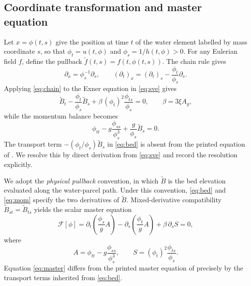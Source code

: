 \documentclass[12pt,a4paper]{article}
\begin{document}
\subsection*{Coordinate transformation and master equation}
Let $x=\phi(t,s)$ give the position at time $t$ of the water element labelled by mass coordinate $s$, so that $\phi_t=u(t,\phi)$ and $\phi_s=1/h(t,\phi)>0$. For any Eulerian field $f$, define the pullback $\tilde f(t,s)=f(t,\phi(t,s))$. The chain rule gives
\begin{equation}
\partial_x=\phi_s^{-1}\partial_s,\qquad
(\partial_t)_x=(\partial_t)_s-\frac{\phi_t}{\phi_s}\partial_s.
\label{eq:chain}
\end{equation}
Applying \eqref{eq:chain} to the Exner equation in \eqref{eq:sve} gives
\begin{equation}
\tilde B_t-\frac{\phi_t}{\phi_s}\tilde B_s+\beta\,(\phi_t)^{2}\frac{\phi_{ts}}{\phi_s}=0,
\qquad \beta=3\xi A_g,
\label{eq:bed}
\end{equation}
while the momentum balance becomes
\begin{equation}
\phi_{tt}-g\frac{\phi_{ss}}{\phi_s^{3}}+\frac{g}{\phi_s}\tilde B_s=0.
\label{eq:mom}
\end{equation}
The transport term $-(\phi_t/\phi_s)\tilde B_s$ in \eqref{eq:bed} is absent from the printed equation of \cite{sve}. We resolve this by direct derivation from \eqref{eq:sve} and record the resolution explicitly.

We adopt the \emph{physical pullback} convention, in which $\tilde B$ is the bed elevation evaluated along the water-parcel path. Under this convention, \eqref{eq:bed} and \eqref{eq:mom} specify the two derivatives of $\tilde B$. Mixed-derivative compatibility $\tilde B_{st}=\tilde B_{ts}$ yields the scalar master equation
\begin{equation}
\mathcal F[\phi]=\partial_t\!\left(\frac{\phi_s}{g}A\right)
-\partial_s\!\left(\frac{\phi_t}{g}A\right)+\beta\,\partial_s S=0,
\label{eq:master}
\end{equation}
where
\begin{equation}
A=\phi_{tt}-g\frac{\phi_{ss}}{\phi_s^{3}},\qquad
S=(\phi_t)^{2}\frac{\phi_{ts}}{\phi_s}.
\end{equation}
Equation \eqref{eq:master} differs from the printed master equation of \cite{sve} precisely by the transport terms inherited from \eqref{eq:bed}.
\end{document}
